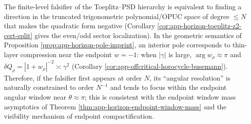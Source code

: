 \begin{remark}\label{rem:app-horizon-toeplitz-witness-endpoint-focus}
The finite-level falsifier of the Toeplitz--PSD hierarchy is equivalent to finding a direction in the truncated trigonometric polynomial/OPUC space of degree \(\le N\) that makes the quadratic form negative (Corollary \ref{cor:app-horizon-toeplitz-z2-cert-split} gives the even/odd sector localization).
In the geometric semantics of Proposition \ref{prop:app-horizon-pole-imprint}, an interior pole corresponds to thin-layer compression near the endpoint \(w=-1\): when \(|\gamma|\) is large, \(\arg w_\rho\approx\pi\) and \(\delta Q_\rho=|1+w_\rho|^{-2}\asymp \gamma^2\) (Corollary \ref{cor:app-offcritical-horocycle-busemann}).
Therefore, if the falsifier first appears at order \(N\), its ``angular resolution'' is naturally constrained to order \(N^{-1}\) and tends to focus within the endpoint angular window near \(\theta\approx\pi\); this is consistent with the endpoint window mass asymptotics of Theorem \ref{thm:app-horizon-endpoint-window-mass} and the visibility mechanism of endpoint compactification.
\end{remark}

\endinput
\endinput




